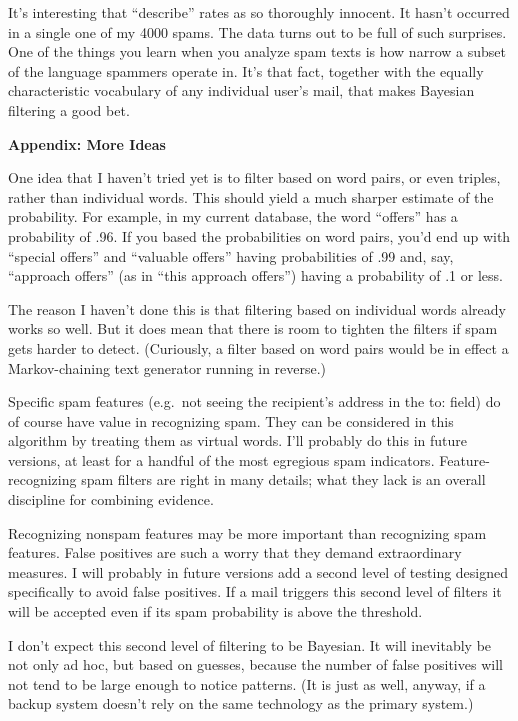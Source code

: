 It's interesting that ``describe'' rates as so thoroughly innocent. It
hasn't occurred in a single one of my 4000 spams. The data turns out to
be full of such surprises. One of the things you learn when you analyze
spam texts is how narrow a subset of the language spammers operate in.
It's that fact, together with the equally characteristic vocabulary of
any individual user's mail, that makes Bayesian filtering a good bet.

\textbf{Appendix: More Ideas}

One idea that I haven't tried yet is to filter based on word pairs, or
even triples, rather than individual words. This should yield a much
sharper estimate of the probability. For example, in my current
database, the word ``offers'' has a probability of .96. If you based the
probabilities on word pairs, you'd end up with ``special offers'' and
``valuable offers'' having probabilities of .99 and, say, ``approach
offers'' (as in ``this approach offers'') having a probability of .1 or
less.

The reason I haven't done this is that filtering based on individual
words already works so well. But it does mean that there is room to
tighten the filters if spam gets harder to detect. (Curiously, a filter
based on word pairs would be in effect a Markov-chaining text generator
running in reverse.)

Specific spam features (e.g.~not seeing the recipient's address in the
to: field) do of course have value in recognizing spam. They can be
considered in this algorithm by treating them as virtual words. I'll
probably do this in future versions, at least for a handful of the most
egregious spam indicators. Feature-recognizing spam filters are right in
many details; what they lack is an overall discipline for combining
evidence.

Recognizing nonspam features may be more important than recognizing spam
features. False positives are such a worry that they demand
extraordinary measures. I will probably in future versions add a second
level of testing designed specifically to avoid false positives. If a
mail triggers this second level of filters it will be accepted even if
its spam probability is above the threshold.

I don't expect this second level of filtering to be Bayesian. It will
inevitably be not only ad hoc, but based on guesses, because the number
of false positives will not tend to be large enough to notice patterns.
(It is just as well, anyway, if a backup system doesn't rely on the same
technology as the primary system.)

